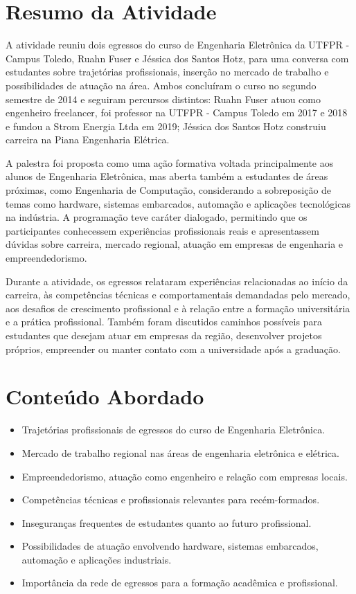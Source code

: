 \documentclass[12pt,a4paper]{article}
\begin{document}
\section{Resumo da Atividade}

A atividade reuniu dois egressos do curso de Engenharia Eletrônica da UTFPR - Campus Toledo, Ruahn Fuser e Jéssica dos Santos Hotz, para uma conversa com estudantes sobre trajetórias profissionais, inserção no mercado de trabalho e possibilidades de atuação na área. Ambos concluíram o curso no segundo semestre de 2014 e seguiram percursos distintos: Ruahn Fuser atuou como engenheiro freelancer, foi professor na UTFPR - Campus Toledo em 2017 e 2018 e fundou a Strom Energia Ltda em 2019; Jéssica dos Santos Hotz construiu carreira na Piana Engenharia Elétrica.

A palestra foi proposta como uma ação formativa voltada principalmente aos alunos de Engenharia Eletrônica, mas aberta também a estudantes de áreas próximas, como Engenharia de Computação, considerando a sobreposição de temas como hardware, sistemas embarcados, automação e aplicações tecnológicas na indústria. A programação teve caráter dialogado, permitindo que os participantes conhecessem experiências profissionais reais e apresentassem dúvidas sobre carreira, mercado regional, atuação em empresas de engenharia e empreendedorismo.

Durante a atividade, os egressos relataram experiências relacionadas ao início da carreira, às competências técnicas e comportamentais demandadas pelo mercado, aos desafios de crescimento profissional e à relação entre a formação universitária e a prática profissional. Também foram discutidos caminhos possíveis para estudantes que desejam atuar em empresas da região, desenvolver projetos próprios, empreender ou manter contato com a universidade após a graduação.

\section{Conteúdo Abordado}

\begin{itemize}[leftmargin=*]
    \item Trajetórias profissionais de egressos do curso de Engenharia Eletrônica.
    \item Mercado de trabalho regional nas áreas de engenharia eletrônica e elétrica.
    \item Empreendedorismo, atuação como engenheiro e relação com empresas locais.
    \item Competências técnicas e profissionais relevantes para recém-formados.
    \item Inseguranças frequentes de estudantes quanto ao futuro profissional.
    \item Possibilidades de atuação envolvendo hardware, sistemas embarcados, automação e aplicações industriais.
    \item Importância da rede de egressos para a formação acadêmica e profissional.
\end{itemize}
\end{document}
